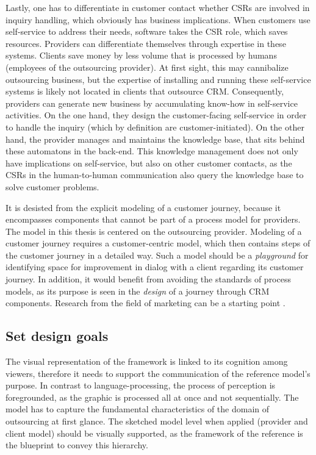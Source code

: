 	Lastly, one has to differentiate in customer contact whether \acrshort{CSR}s are involved in inquiry handling, which obviously has business implications. When customers use self-service to address their needs, software takes the \acrshort{CSR} role, which saves resources. Providers can differentiate themselves through expertise in these systems. Clients save money by less volume that is processed by humans (employees of the outsourcing provider). At first sight, this may cannibalize outsourcing business, but the expertise of installing and running these self-service systems is likely not located in clients that outsource \acrshort{CRM}. Consequently, providers can generate new business by accumulating know-how in self-service activities. On the one hand, they design the customer-facing self-service in order to handle the inquiry (which by definition are customer-initiated). On the other hand, the provider manages and maintains the knowledge base, that sits behind these automatons in the back-end. This knowledge management does not only have implications on self-service, but also on other customer contacts, as the \acrshort{CSR}s in the human-to-human communication also query the knowledge base to solve customer problems.  
	
	It is desisted from the explicit modeling of a customer journey, because it encompasses components that cannot be part of a process model for providers. The model in this thesis is centered on the outsourcing provider. Modeling of a customer journey requires a customer-centric model, which then contains steps of the customer journey in a detailed way. Such a model should be a \textit{playground} for identifying space for improvement in dialog with a client regarding its customer journey. In addition, it would benefit from avoiding the standards of process models, as its purpose is seen in the \textit{design} of a journey through \acrshort{CRM} components. Research from the field of marketing can be a starting point \citep{Lemon_2016, Frow_2007}. 
	
	\subsection{Set design goals}
	
	The visual representation of the framework is linked to its cognition among viewers, therefore it needs to support the communication of the reference model's purpose. In contrast to language-processing, the process of perception is foregrounded, as the graphic is processed all at once and not sequentially. The model has to capture the fundamental characteristics of the domain of outsourcing at first glance. The sketched model level when applied (provider and client model) should be visually supported, as the framework of the reference is the blueprint to convey this hierarchy. 
	
